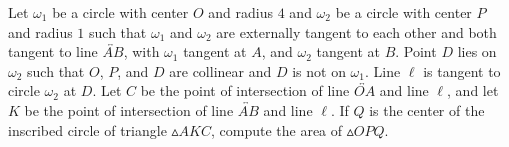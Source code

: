 Let $\omega_1$ be a circle with center $O$ and radius $4$ and $\omega_2$ be a circle with center $P$ and radius $1$ such that $\omega_1$ and $\omega_2$ are externally tangent to each other and both tangent to line $\overleftrightarrow{AB}$, with $\omega_1$ tangent at $A$, and $\omega_2$ tangent at $B$. Point $D$ lies on $\omega_2$ such that $O$, $P$, and $D$ are collinear and $D$ is not on $\omega_1$. Line $\ell$ is tangent to circle $\omega_2$ at $D$. Let $C$ be the point of intersection of line $\overleftrightarrow{OA}$ and line $\ell$, and let $K$ be the point of intersection of line $\overleftrightarrow{AB}$ and line $\ell$. If $Q$ is the center of the inscribed circle of triangle $\vartriangle AKC$, compute the area of $\vartriangle OPQ$.
